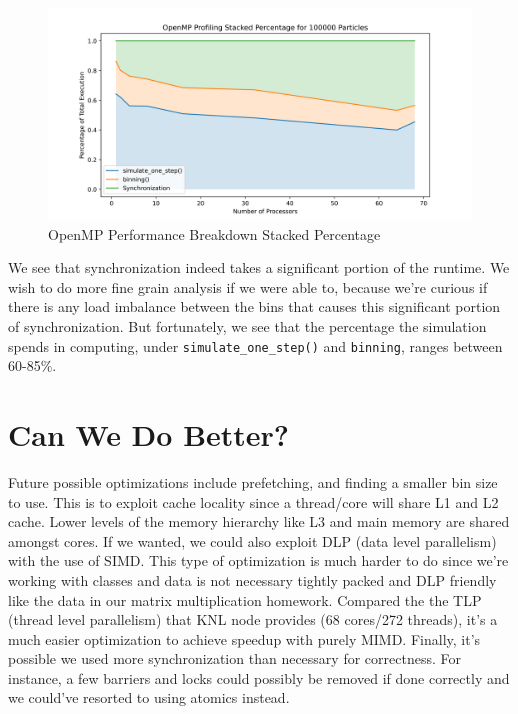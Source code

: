 \documentclass{article}
\begin{document}
\begin{figure}[H]
	\centering
	\includegraphics[width=6in]{figures/openmp_profiling_stacked_percentage.png}
	\caption{OpenMP Performance Breakdown Stacked Percentage}
	\label{fig:openmp-profile-stacked-percentage}
\end{figure}

We see that synchronization indeed takes a significant portion of the runtime. We wish to do more fine grain analysis if we were able to, because we're curious if there is any load imbalance between the bins that causes this significant portion of synchronization. But fortunately, we see that the percentage the simulation spends in computing, under \verb|simulate_one_step()| and \verb|binning|, ranges between 60-85\%.

\section{Can We Do Better?}
Future possible optimizations include prefetching, and finding a smaller bin size to use. This is to exploit cache locality since a thread/core will share L1 and L2 cache. Lower levels of the memory hierarchy like L3 and main memory are shared amongst cores. If we wanted, we could also exploit DLP (data level parallelism) with the use of SIMD. This type of optimization is much harder to do since we're working with classes and data is not necessary tightly packed and DLP friendly like the data in our matrix multiplication homework. Compared the the TLP (thread level parallelism) that KNL node provides (68 cores/272 threads), it's a much easier optimization to achieve speedup with purely MIMD. Finally, it's possible we used more synchronization than necessary for correctness. For instance, a few barriers and locks could possibly be removed if done correctly and we could've resorted to using atomics instead.
\end{document}

